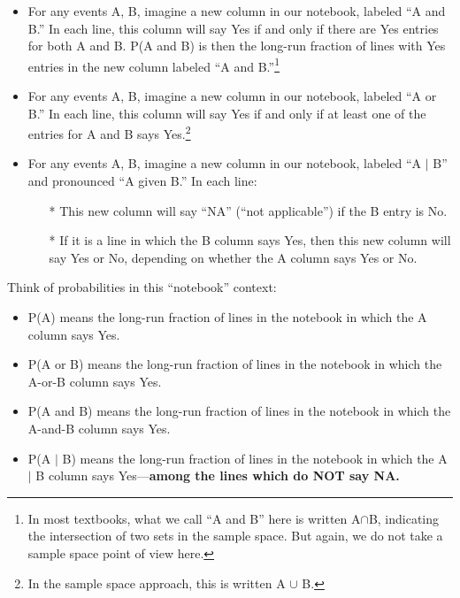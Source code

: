\begin{itemize}
\item For any events A, B, imagine a new column in our notebook,
labeled ``A and B.''  In each line, this column will say Yes if and
only if there are Yes entries for both A and B.  P(A and B) is
then the long-run fraction of lines with Yes entries in the
new column labeled ``A and B.''\footnote{In most textbooks, what we call
``A and B'' here is written A$\cap$B, indicating the intersection of two
sets in the sample space.  But again, we do not take a sample space
point of view here.}

\item For any events A, B, imagine a new column in our notebook,
labeled ``A or B.''  In each line, this column will say Yes if and
only if at least one of the entries for A and B says Yes.\footnote{In
the sample space approach, this is written A $\cup$ B.}

\item For any events A, B, imagine a new column in our notebook, labeled
``A $|$ B'' and pronounced ``A given B.''  In each line: 

\begin{itemize}

\item[*] This new column will say ``NA'' (``not applicable'') if the B
entry is No.

\item[*] If it is a line in which the B column says Yes, then this
new column will say Yes or No, depending on whether the A column
says Yes or No.

\end{itemize}

\end{itemize}

Think of probabilities in this ``notebook'' context:

\begin{itemize}

\item P(A) means the long-run fraction of lines in the notebook in
which the A column says Yes.

\item P(A or B) means the long-run fraction of lines in the notebook in
which the A-or-B column says Yes.

\item P(A and B) means the long-run fraction of lines in the notebook in
which the A-and-B column says Yes.

\item P(A $|$ B) means the long-run fraction of lines in the notebook in
which the A $|$ B column says Yes---{\bf \Large among the lines which do
NOT say NA.}

\end{itemize}


